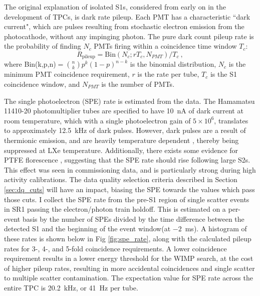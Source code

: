 The original explanation of isolated S1s, considered from early on in the development of TPCs, is dark rate pileup.
Each PMT has a characteristic ``dark current"\cite{noauthor_photomultiplier_2007}, which are pulses resulting from stochastic electron emission from the photocathode, without any impinging photon.
The pure dark count pileup rate is the probability of finding $N_c$ PMTs firing within a coincidence time window $T_c$:
%
\begin{equation}
    R_\text{pileup} = \text{Bin}(N_c; r T_c, N_{PMT}) / T_c ~,
    \label{eq:dark_count_pileup}
\end{equation}
\noindent
where Bin(k,p,n)$=\genfrac(){0pt}{}{n} { k}p^k(1-p)^{n-k}$ is the binomial distribution, $N_c$ is the minimum PMT coincidence requirement, $r$ is the rate per tube, $T_c$ is the S1 coincidence window, and $N_{PMT}$ is the number of PMTs.

The single photoelectron (SPE) rate is estimated from the data. 
The Hamamatsu 11410-20 photomultiplier tubes \cite{noauthor_photomultiplier_2007} are specified to have 10~nA of dark current at room temperature, which with a single photoelectron gain of $5\times 10^6$, translates to approximately 12.5~kHz of dark pulses.
However, dark pulses are a result of thermionic emission, and are heavily temperature dependent \cite{nikkel_demonstration_2007}, thereby being suppressed at LXe temperature.
Additionally, there exists some evidence for PTFE florescence \cite{shaw_ultraviolet_2007}, suggesting that the SPE rate should rise following large S2s.
This effect was seen in commissioning data, and is particularly strong during high activity calibrations.
The data quality selection criteria described in Section \ref{sec:dq_cuts} will have an impact, biasing the SPE towards the values which pass those cuts.
I collect the SPE rate from the pre-S1 region of single scatter events in SR1 passing the electron/photon train holdoff.
This is estimated on a per-event basis by the number of SPEs divided by the time difference between the detected S1 and the beginning of the event window(at $-2$~ms).
A histogram of these rates is shown below in Fig \ref{fig:spe_rate}, along with the calculated pileup rates for 3-, 4-, and 5-fold coincidence requirements.
A lower coincidence requirement results in a lower energy threshold for the WIMP search, at the cost of higher pileup rates, resulting in more accidental coincidences and single scatter to multiple scatter contamination.
The expectation value for SPE rate across the entire TPC is 20.2~kHz, or 41~Hz per tube.

